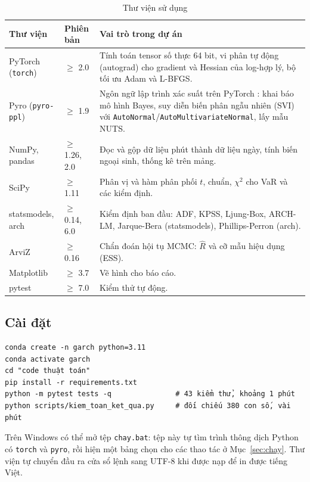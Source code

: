 \documentclass[11pt,a4paper]{article}
\renewcommand{\_}{\gachduoi\allowbreak}
\newcommand{\tep}[1]{\texttt{#1}}
\newcommand{\ham}[1]{\texttt{#1}}
\begin{document}
\begin{table}[H]\centering\small
\caption{Thư viện sử dụng}\label{tab:thu-vien}
\begin{tabularx}{\textwidth}{@{}l l L@{}}
\toprule
\textbf{Thư viện} & \textbf{Phiên bản} & \textbf{Vai trò trong dự án} \\
\midrule
PyTorch (\tep{torch}) & $\ge$ 2.0 & Tính toán tensor số thực 64 bit, vi phân tự động (autograd) cho gradient và Hessian của log-hợp lý, bộ tối ưu Adam và L-BFGS. \\
Pyro (\tep{pyro-ppl}) & $\ge$ 1.9 & Ngôn ngữ lập trình xác suất trên PyTorch \cite{bingham2019pyro}: khai báo mô hình Bayes, suy diễn biến phân ngẫu nhiên (SVI) với \ham{AutoNormal}/\ham{AutoMultivariateNormal}, lấy mẫu NUTS. \\
NumPy, pandas & $\ge$ 1.26, 2.0 & Đọc và gộp dữ liệu phút thành dữ liệu ngày, tính biến ngoại sinh, thống kê trên mảng. \\
SciPy & $\ge$ 1.11 & Phân vị và hàm phân phối $t$, chuẩn, $\chi^2$ cho VaR và các kiểm định. \\
statsmodels, arch & $\ge$ 0.14, 6.0 & Kiểm định ban đầu: ADF, KPSS, Ljung-Box, ARCH-LM, Jarque-Bera (statsmodels), Phillips-Perron (arch). \\
ArviZ & $\ge$ 0.16 & Chẩn đoán hội tụ MCMC: $\hat R$ và cỡ mẫu hiệu dụng (ESS). \\
Matplotlib & $\ge$ 3.7 & Vẽ hình cho báo cáo. \\
pytest & $\ge$ 7.0 & Kiểm thử tự động. \\
\bottomrule
\end{tabularx}
\end{table}

\subsection{Cài đặt}
\begin{Verbatim}[frame=single,fontsize=\small]
conda create -n garch python=3.11
conda activate garch
cd "code thuật toán"
pip install -r requirements.txt
python -m pytest tests -q               # 43 kiểm thử, khoảng 1 phút
python scripts/kiem_toan_ket_qua.py     # đối chiếu 380 con số, vài phút
\end{Verbatim}
Trên Windows có thể mở tệp \tep{chay.bat}: tệp này tự tìm trình thông dịch Python có \tep{torch} và \tep{pyro}, rồi hiện một bảng chọn cho các thao tác ở Mục~\ref{sec:chay}. Thư viện tự chuyển đầu ra cửa sổ lệnh sang UTF-8 khi được nạp để in được tiếng Việt.
\end{document}
